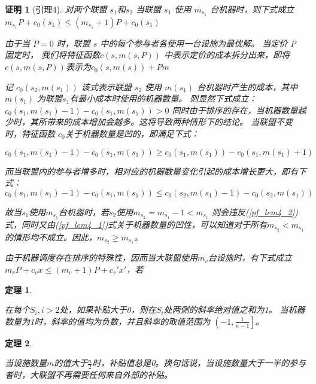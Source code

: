 \documentclass[UTF8]{article}
\newtheorem{thm}{\hspace{2em}定理}
\newtheorem{pf}{\hspace{2em}证明}
\begin{document}
\begin{pf}[引理4]
对两个联盟 $s_1$和$s_2$
当联盟 $s_1$ 使用 $m_{s_1}$ 台机器时，则下式成立
$m_{s_1}P+c_0(s_1) \leq (m_{s_1}+1)P+c_0(s_1)$


由于当 $P=0$ 时，联盟 $s$ 中的每个参与者各使用一台设施为最优解。
当定价 P 固定时，
我们将特征函数$c(s,m(s,P))$ 中表示定价的成本拆分出来，即将$c(s,m(s,P))$表示为$c_0(s,m(s))+Pm$

记 $c_0(s_2,m(s_1))$ 该式表示联盟 $s_2$ 使用 $m(s_1)$ 台机器时产生的成本，其中$m(s_1)$ 为联盟$s_1$有最小成本时使用的机器数量。
则显然下式成立：
$c_0(s_1,m(s_1)-1)-c_0(s_1,m(s_1))>0$
同时由于排序的存在，当机器数量越少时，其所带来的成本增加会越多。这将导致两种情形下的结论。
当联盟不变时，特征函数 $c_0$关于机器数量是凹的，即满足下式：

\begin{equation}\label{pf_lem4_1}
  c_0(s_1,m(s_1)-1)-c_0(s_1,m(s_1)) \geq
  c_0(s_1,m(s_1))-c_0(s_1,m(s_1)+1)
\end{equation}


而当联盟内的参与者增多时，相对应的机器数量变化引起的成本增长更大，即有下式：
\begin{equation}\label{pf_lem4_2}
  c_0(s_1,m(s_1)-1)-c_0(s_1,m(s_1)) \leq
  c_0(s_2,m(s_1)-1)-c_0(s_2,m(s_1))
\end{equation}

故当$s_1$使用$m_{s_1}$台机器时，若$s_2$使用$m_{s_2}=m_{s_1}-1 < m_{s_1}$ 则会违反(\ref{pf_lem4_2})式，同时又由(\ref{pf_lem4_1})式关于机器数量的凹性，可以知道对于所有$m_{s_2}<m_{s_1}$的情形均不成立。因此，$m_{s_2} \geq m_{s_1}$。



由于机器调度存在排序的特殊性，因而当大联盟使用$m_v$台设施时，有下式成立$m_vP+c_vx \leq (m_v+1)P+c_v'x'$，若


\end{pf}


\begin{thm}\label{thm2}

在每个$S_i,i>2$处，如果补贴大于0，则在$S_i$处两侧的斜率绝对值之和为1。
当机器数量为1时，斜率的值均为负数，并且斜率的取值范围为 $\left(-1, \frac{1}{n-1} \right]$。
\end{thm}

\begin{thm}\label{thm3}

当设施数量$m$的值大于$\frac{n}{2}$时，补贴值总是0。换句话说，当设施数量大于一半的参与者时，大联盟不再需要任何来自外部的补贴。 \\
\end{thm}
\end{document}

